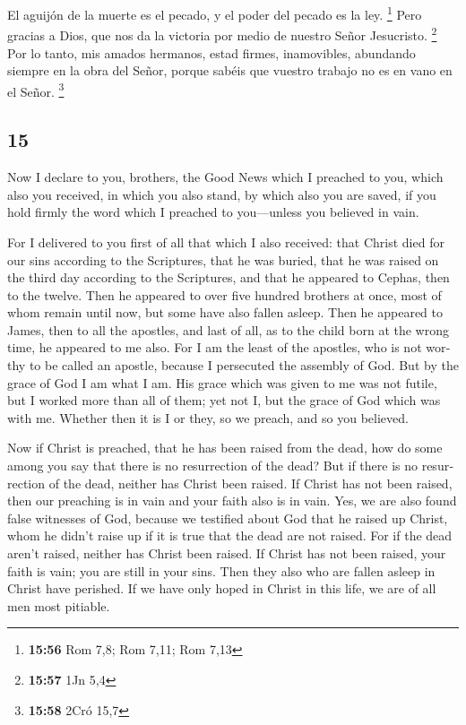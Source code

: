 \begin{paracol}{2}
 El aguijón de la muerte es el pecado, y el poder del
pecado es la ley. \footnote{\textbf{15:56} Rom 7,8; Rom 7,11; Rom 7,13}
 Pero gracias a Dios, que nos da la victoria por medio de
nuestro Señor Jesucristo. \footnote{\textbf{15:57} 1Jn 5,4}
 Por lo tanto, mis amados hermanos, estad firmes,
inamovibles, abundando siempre en la obra del Señor, porque sabéis que
vuestro trabajo no es en vano en el Señor. \footnote{\textbf{15:58} 2Cró
  15,7}

\switchcolumn
\begin{otherlanguage}{english}

\hypertarget{section-29}{%
\section{15}\label{section-29}}

 Now I declare to you, brothers, the Good News which I
preached to you, which also you received, in which you also stand,
 by which also you are saved, if you hold firmly the word
which I preached to you---unless you believed in vain.

 For I delivered to you first of all that which I also
received: that Christ died for our sins according to the Scriptures,
 that he was buried, that he was raised on the third day
according to the Scriptures,  and that he appeared to
Cephas, then to the twelve.  Then he appeared to over five
hundred brothers at once, most of whom remain until now, but some have
also fallen asleep.  Then he appeared to James, then to
all the apostles,  and last of all, as to the child born
at the wrong time, he appeared to me also.  For I am the
least of the apostles, who is not worthy to be called an apostle,
because I persecuted the assembly of God.  But by the
grace of God I am what I am. His grace which was given to me was not
futile, but I worked more than all of them; yet not I, but the grace of
God which was with me.  Whether then it is I or they, so
we preach, and so you believed.

 Now if Christ is preached, that he has been raised from
the dead, how do some among you say that there is no resurrection of the
dead?  But if there is no resurrection of the dead,
neither has Christ been raised.  If Christ has not been
raised, then our preaching is in vain and your faith also is in vain.
 Yes, we are also found false witnesses of God, because
we testified about God that he raised up Christ, whom he didn't raise up
if it is true that the dead are not raised.  For if the
dead aren't raised, neither has Christ been raised.  If
Christ has not been raised, your faith is vain; you are still in your
sins.  Then they also who are fallen asleep in Christ
have perished.  If we have only hoped in Christ in this
life, we are of all men most pitiable.


\end{otherlanguage}
\end{paracol}
